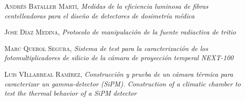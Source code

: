 \begin{thebibliography}{99}
 \textsc{Andrés Bataller Martí},
\textit{Medidas de la eficiencia luminosa de fibras centelleadoras para el diseño de detectores de dosimetría médica}

 \textsc{Jose Díaz Medina},
\textit{Protocolo de manipulación de la fuente radiactiva de tritio}

 \textsc{Marc Querol Segura},
\textit{Sistema de test para la caracterización de los fotomultiplicadores de silicio de la cámara de proyección temperal NEXT-100}

 \textsc{Luis VIllarreal Ramírez},
\textit{Construcción y prueba de un cámara térmica para caracterizar un gamma-detector (SiPM). Construction of a climatic chamber to test the thermal behavior of a SiPM detector}
 
\end{thebibliography}